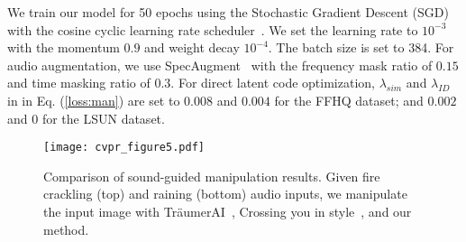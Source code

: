\documentclass[10pt,twocolumn,letterpaper]{article}
\def\authornote#1#2#3{{\textcolor{#2}{\textsl{\small[#1: #3]}}}}
\newcommand{\wonmin}[1]{\authornote{Wonmin}{Blue}{#1}} %
\newcommand{\sang}[1]{\authornote{Sang}{Green}{#1}}
\begin{document}
We train our model for 50 epochs using the Stochastic Gradient Descent (SGD) with the cosine cyclic learning rate scheduler~\cite{smith2017cyclical}. We set the learning rate to $10^{-3}$ with the momentum $0.9$ and weight decay $10^{-4}$. The batch size is set to 384. For audio augmentation, we use SpecAugment~\cite{park19e_interspeech} with the frequency mask ratio of $0.15$ and time masking ratio of $0.3$. For direct latent code optimization, $\lambda_{sim}$ and $\lambda_{ID}$ in in Eq. (\ref{loss:man}) are set to $0.008$ and $0.004$ for the FFHQ dataset; and $0.002$ and $0$ for the LSUN dataset.







\begin{figure}[h]
  \centering
  \texttt{[image: cvpr\_figure5.pdf]}
  \vspace{-1.5em}
  \caption{Comparison of sound-guided manipulation results. Given fire crackling (top) and raining (bottom) audio inputs, we manipulate the input image with Tr\"{a}umerAI~\cite{jeong2021tr}, Crossing you in style~\cite{lee2020crossing}, and our method.}
  \vspace{-1.5em}
  \label{fig:cvprfig5}
\end{figure}
\end{document}
